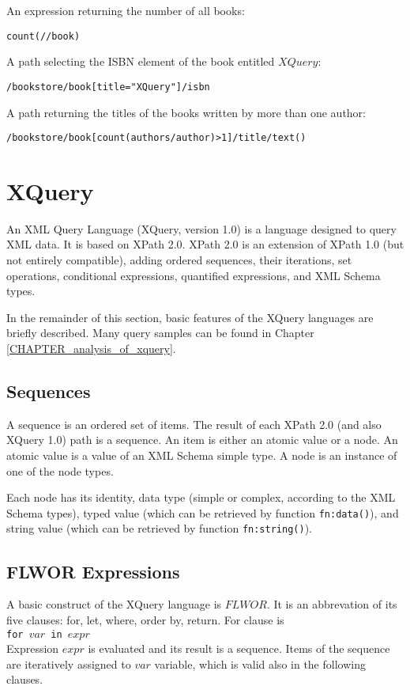 An expression returning the number of all books:
\begin{alltt}
count(//book)
\end{alltt}

A path selecting the ISBN element of the book entitled $XQuery$:
\begin{alltt}
/bookstore/book[title = "XQuery"]/isbn
\end{alltt}

A path returning the titles of the books written by more than one author:
\begin{alltt}
/bookstore/book[count(authors/author) > 1]/title/text()
\end{alltt}


\section{XQuery}
An XML Query Language (XQuery, version 1.0)  is a language designed to query XML data. It is based on XPath 2.0. XPath 2.0 is an extension of XPath 1.0 (but not entirely compatible), adding ordered sequences, their iterations, set operations, conditional expressions, quantified expressions, and XML Schema types.

In the remainder of this section, basic features of the XQuery languages are briefly described. Many query samples can be found in Chapter \ref{CHAPTER_analysis_of_xquery}.

\subsection{Sequences}
A sequence is an ordered set of items. The result of each XPath 2.0 (and also XQuery 1.0) path is a sequence. An item is either an atomic value or a node. An atomic value is a value of an XML Schema simple type. A node is an instance of one of the node types.

Each node has its identity, data type (simple or complex, according to the XML Schema types), typed value (which can be retrieved by function \texttt{fn:data()}), and string value (which can be retrieved by function \texttt{fn:string()}).

\subsection{FLWOR Expressions}
A basic construct of the XQuery language is $FLWOR$. It is an abbrevation of its five clauses: for, let, where, order by, return. For clause is \\
\texttt{for $var$ in $expr$} \\
Expression $expr$ is evaluated and its result is a sequence. Items of the sequence are iteratively assigned to $var$ variable, which is valid also in the following clauses.

